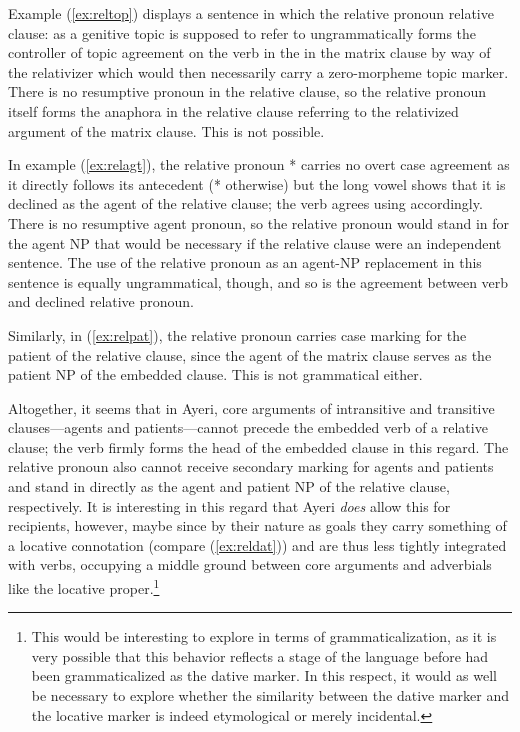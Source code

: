 Example (\ref{ex:reltop}) displays a sentence in which the relative pronoun 
relative clause:  as a genitive topic is supposed to refer to 
ungrammatically forms the controller of topic agreement on the verb in the 
 in the matrix clause by way of the relativizer 
 which would then necessarily carry a zero-morpheme topic 
marker. There is no resumptive pronoun in the relative clause, so the relative 
pronoun itself forms the anaphora in the relative clause referring to the 
relativized argument of the matrix clause. This is not possible.

In example (\ref{ex:relagt}), the relative pronoun * carries 
no overt case agreement as it directly follows its antecedent 
(* otherwise) but the long vowel shows that it is declined 
as the agent of the relative clause; the verb agrees using  
accordingly. There is no resumptive agent pronoun, so the relative pronoun 
would stand in for the agent NP that would be necessary if the relative clause 
were an independent sentence. The use of the relative pronoun as an agent-NP 
replacement in this sentence is equally ungrammatical, though, and so is the 
agreement between verb and declined relative pronoun.

Similarly, in (\ref{ex:relpat}), the relative pronoun carries case marking for 
the patient of the relative clause, since the agent of the matrix clause serves 
as the patient NP of the embedded clause. This is not grammatical either.

Altogether, it seems that in Ayeri, core arguments of intransitive and 
transitive clauses---agents and patients---cannot precede the embedded verb of 
a relative clause; the verb firmly forms the head of the embedded clause in 
this regard. The relative pronoun also cannot receive secondary marking for 
agents and patients and stand in directly as the agent and patient NP of the 
relative clause, respectively. It is interesting in this regard that Ayeri 
\emph{does} allow this for recipients, however, maybe since by their nature as 
goals they carry something of a locative connotation (compare 
(\ref{ex:reldat})) and are thus less tightly integrated with verbs, occupying a 
middle ground between core arguments and adverbials like the locative 
proper.\footnote{This would be interesting to explore in terms of 
grammaticalization, as it is very possible that this behavior reflects a stage 
of the language before  had been grammaticalized as the dative 
marker. In this respect, it would as well be necessary to explore whether the 
similarity between the dative marker  and the locative marker 
 is indeed etymological or merely incidental.}

